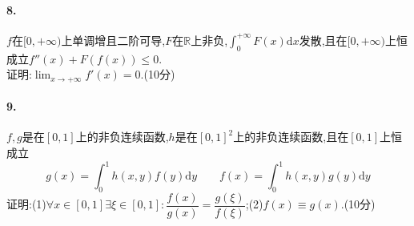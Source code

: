 \documentclass[UTF8]{article}
\begin{document}
\paragraph*{8.}$f$在$[0,+\infty)$上单调增且二阶可导,$F$在$\mathbb{R}$上非负,$\displaystyle \int_0^{+\infty}F(x) \mathrm{d}x$发散,且在$[0,+\infty)$上恒成立$f''(x)+F(f(x))\leq 0$.\\ 证明:$\displaystyle \lim_{x\to +\infty}f'(x)=0$.(10分)

\paragraph*{9.}$f,g$是在$[0,1]$上的非负连续函数,$h$是在$[0,1]^2$上的非负连续函数,且在$[0,1]$上恒成立$$g(x)=\int_0^1 h(x,y)f(y)\mathrm{d}y\qquad f(x)=\int_0^1 h(x,y)g(y)\mathrm{d}y$$
证明:(1)$\forall x\in [0,1]\exists \xi\in [0,1]:\dfrac{f(x)}{g(x)}=\dfrac{g(\xi)}{f(\xi)}$;(2)$f(x)\equiv g(x)$.(10分)
\end{document}
